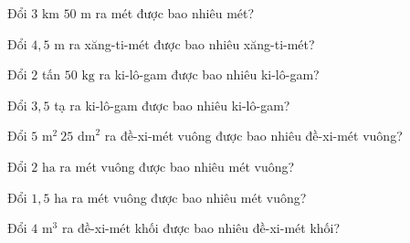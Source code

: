 
\begin{ex}
  Đổi $3\text{ km } 50\text{ m}$ ra mét được bao nhiêu mét?
\end{ex}

\begin{ex}
  Đổi $4{,}5\text{ m}$ ra xăng-ti-mét được bao nhiêu xăng-ti-mét?
\end{ex}

\begin{ex}
  Đổi $2$ tấn $50\text{ kg}$ ra ki-lô-gam được bao nhiêu ki-lô-gam?
\end{ex}

\begin{ex}
  Đổi $3{,}5$ tạ ra ki-lô-gam được bao nhiêu ki-lô-gam?
\end{ex}

\begin{ex}
  Đổi $5\text{ m}^2\ 25\text{ dm}^2$ ra đề-xi-mét vuông được bao nhiêu đề-xi-mét vuông?
\end{ex}

\begin{ex}
  Đổi $2\text{ ha}$ ra mét vuông được bao nhiêu mét vuông?
\end{ex}

\begin{ex}
  Đổi $1{,}5\text{ ha}$ ra mét vuông được bao nhiêu mét vuông?
\end{ex}

\begin{ex}
  Đổi $4\text{ m}^3$ ra đề-xi-mét khối được bao nhiêu đề-xi-mét khối?
\end{ex}

